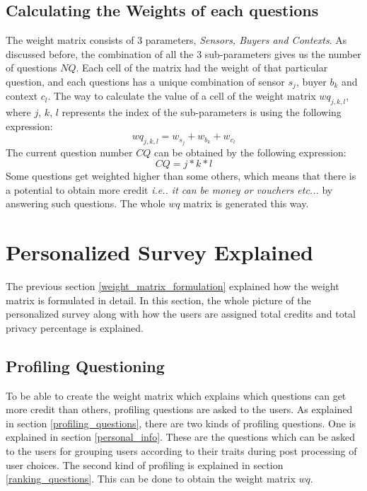 \subsection{Calculating the Weights of each questions}
The weight matrix consists of 3 parameters, {\it Sensors, Buyers and Contexts}. As discussed before, the combination
of all the 3 sub-parameters gives us the number of questions $NQ$. Each cell of the matrix had the weight of that particular question,
and each questions has a unique combination of sensor $s_j$, buyer $b_k$ and context $c_l$. The way to calculate the value of a cell of the weight matrix $wq_{j,k,l}$, where $j$, $k$, $l$
represents the index of the sub-parameters
is using the following expression:
$$wq_{j,k,l} = w_{s_{j}} + w_{b_{k}} + w_{c_{l}}$$
The current question number $CQ$ can be obtained by the following expression:
 $$CQ = j*k*l$$
Some questions get weighted higher than some others, which means that there is a potential
to obtain more credit {\it i.e.. it can be money or vouchers etc...} by answering such questions. The whole $wq$ matrix is generated this way.

\section{Personalized Survey Explained}
The previous section \ref{weight_matrix_formulation} explained how the weight matrix is formulated in detail. In this section, the whole picture of the personalized survey
along with how the users are assigned total credits and total privacy percentage is explained.


\subsection{Profiling Questioning} \label{in_action_profiling}
To be able to create the weight matrix which explains which questions can get more credit than others, profiling questions are
asked to the users. As explained in section \ref{profiling_questions}, there are two kinds of profiling questions. One is explained in
section 	\ref{personal_info}. These are the questions which can be asked to the users for grouping users according to their traits
during post processing of user choices. The second kind of profiling is explained in section \ref{ranking_questions}. This can be done
to obtain the weight matrix $wq$.\\

